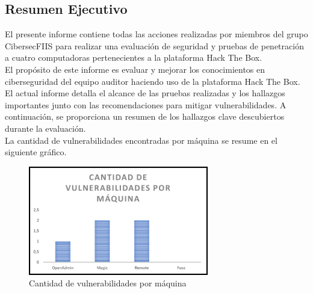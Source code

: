\documentclass[a4paper]{article}
\begin{document}
    
    \clearpage
        \tableofcontents
    \clearpage
    \listoffigures
    \clearpage
    \cfoot{\thepage}
    \setcounter{page}{1}
    \begin{center}
        \section*{Resumen Ejecutivo}
    \end{center}
\vspace{0.1cm}
\begin{large}
El presente informe contiene todas las acciones realizadas por miembros del grupo CibersecFIIS para realizar una evaluación de seguridad y pruebas de penetración a cuatro computadoras pertenecientes a la plataforma Hack The Box.
\\
El propósito de este informe es evaluar y mejorar los conocimientos en ciberseguridad del equipo auditor haciendo uso de la plataforma Hack The Box.
\\
El actual informe detalla el alcance de las pruebas realizadas y los hallazgos importantes junto con las recomendaciones para mitigar vulnerabilidades. A continuación, se proporciona un resumen de los hallazgos clave descubiertos durante la evaluación.
\\
La cantidad de vulnerabilidades encontradas por máquina se resume en el siguiente gráfico.
\end{large}
\begin{figure}[h]
    \centering
    \includegraphics[width=0.7\textwidth]{imagenes/vuln_x_maq.png}
    \caption{Cantidad de vulnerabilidades por máquina}
\end{figure}
\end{document}
